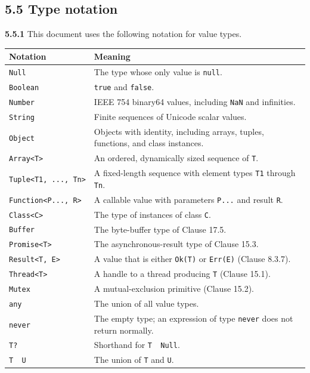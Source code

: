 \documentclass[
  english,
  11pt,
  a4paper,
]{article}
\begin{document}
\subsection{5.5 Type notation}\label{type-notation}

\textbf{5.5.1} This document uses the following notation for value
types.

\begin{longtable}[]{@{}
  >{\raggedright\arraybackslash}p{}
  >{\raggedright\arraybackslash}p{}@{}}
\toprule\noalign{}
\begin{minipage}[b]{\linewidth}\raggedright
Notation
\end{minipage} & \begin{minipage}[b]{\linewidth}\raggedright
Meaning
\end{minipage} \\
\midrule\noalign{}
\endhead
\bottomrule\noalign{}
\endlastfoot
\texttt{Null} & The type whose only value is \texttt{null}. \\
\texttt{Boolean} & \texttt{true} and \texttt{false}. \\
\texttt{Number} & IEEE 754 binary64 values, including \texttt{NaN} and
infinities. \\
\texttt{String} & Finite sequences of Unicode scalar values. \\
\texttt{Object} & Objects with identity, including arrays, tuples,
functions, and class instances. \\
\texttt{Array\textless{}T\textgreater{}} & An ordered, dynamically sized
sequence of \texttt{T}. \\
\texttt{Tuple\textless{}T1,\ ...,\ Tn\textgreater{}} & A fixed-length
sequence with element types \texttt{T1} through \texttt{Tn}. \\
\texttt{Function\textless{}P...,\ R\textgreater{}} & A callable value
with parameters \texttt{P...} and result \texttt{R}. \\
\texttt{Class\textless{}C\textgreater{}} & The type of instances of
class \texttt{C}. \\
\texttt{Buffer} & The byte-buffer type of Clause 17.5. \\
\texttt{Promise\textless{}T\textgreater{}} & The asynchronous-result
type of Clause 15.3. \\
\texttt{Result\textless{}T,\ E\textgreater{}} & A value that is either
\texttt{Ok(T)} or \texttt{Err(E)} (Clause 8.3.7). \\
\texttt{Thread\textless{}T\textgreater{}} & A handle to a thread
producing \texttt{T} (Clause 15.1). \\
\texttt{Mutex} & A mutual-exclusion primitive (Clause 15.2). \\
\texttt{any} & The union of all value types. \\
\texttt{never} & The empty type; an expression of type \texttt{never}
does not return normally. \\
\texttt{T?} & Shorthand for \texttt{T\ \textbar{}\ Null}. \\
\texttt{T\ \textbar{}\ U} & The union of \texttt{T} and \texttt{U}. \\
\end{longtable}
\end{document}
